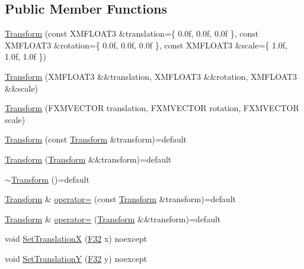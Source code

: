\subsection*{Public Member Functions}
\begin{DoxyCompactItemize}
\item 
\hyperlink{structmage_1_1_transform_a3d324dc935e11ee5e82957d58553fd7d}{Transform} (const X\+M\+F\+L\+O\+A\+T3 \&translation=\{ 0.\+0f, 0.\+0f, 0.\+0f \}, const X\+M\+F\+L\+O\+A\+T3 \&rotation=\{ 0.\+0f, 0.\+0f, 0.\+0f \}, const X\+M\+F\+L\+O\+A\+T3 \&scale=\{ 1.\+0f, 1.\+0f, 1.\+0f \})
\item 
\hyperlink{structmage_1_1_transform_aa2f3e3e655a2d50404b75871a8c358c3}{Transform} (X\+M\+F\+L\+O\+A\+T3 \&\&translation, X\+M\+F\+L\+O\+A\+T3 \&\&rotation, X\+M\+F\+L\+O\+A\+T3 \&\&scale)
\item 
\hyperlink{structmage_1_1_transform_a3e5384097613e06e6681d43a0748e45b}{Transform} (F\+X\+M\+V\+E\+C\+T\+OR translation, F\+X\+M\+V\+E\+C\+T\+OR rotation, F\+X\+M\+V\+E\+C\+T\+OR scale)
\item 
\hyperlink{structmage_1_1_transform_acea4b0d9eb6fc574cff9046d1d1d3f63}{Transform} (const \hyperlink{structmage_1_1_transform}{Transform} \&transform)=default
\item 
\hyperlink{structmage_1_1_transform_a79c128d8c73c8854765e8ea8fa5f42e1}{Transform} (\hyperlink{structmage_1_1_transform}{Transform} \&\&transform)=default
\item 
\hyperlink{structmage_1_1_transform_a2da8c6542920e0748a504c32c54073f6}{$\sim$\+Transform} ()=default
\item 
\hyperlink{structmage_1_1_transform}{Transform} \& \hyperlink{structmage_1_1_transform_a399c432b387235b3ae964bfed27ac95c}{operator=} (const \hyperlink{structmage_1_1_transform}{Transform} \&transform)=default
\item 
\hyperlink{structmage_1_1_transform}{Transform} \& \hyperlink{structmage_1_1_transform_a73f47760665264da8af254fa937b3560}{operator=} (\hyperlink{structmage_1_1_transform}{Transform} \&\&transform)=default
\item 
void \hyperlink{structmage_1_1_transform_a99a7e4aaba6cee799bb014d9a1b5e227}{Set\+TranslationX} (\hyperlink{namespacemage_aa97e833b45f06d60a0a9c4fc22ae02c0}{F32} x) noexcept
\item 
void \hyperlink{structmage_1_1_transform_ae33a9ea844cac0bdb303e4e347e576c3}{Set\+TranslationY} (\hyperlink{namespacemage_aa97e833b45f06d60a0a9c4fc22ae02c0}{F32} y) noexcept
\item 

\end{DoxyCompactItemize}
